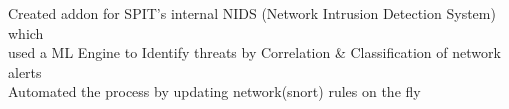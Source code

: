 \documentclass[]{deedy-resume-openfont}
\begin{document}
\begin{minipage}[t]{0.66\textwidth}
\vspace{2mm}
\small {
\hspace{2mm}  \textbullet{} Created addon for SPIT's internal NIDS (Network Intrusion Detection System) which\\
\hspace{5mm} used a ML Engine to Identify threats by Correlation \& Classification of network alerts\\
\hspace{2mm}  \textbullet{} Automated the process by updating network(snort) rules on the fly\\
}
\sectionsep




\end{minipage}
\end{document}
